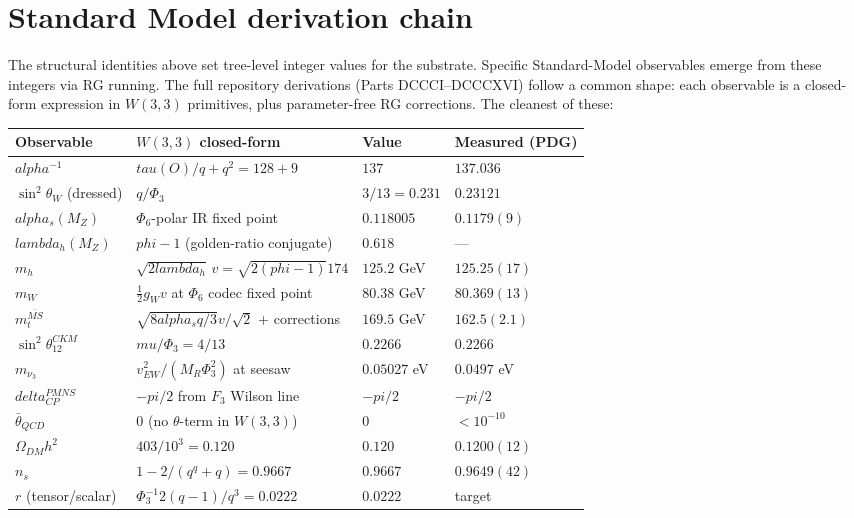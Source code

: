 \documentclass[11pt]{article}
\def\mathbb#1{#1}%
\def\textbf#1{#1}%
\def\text#1{#1}%
\def\alpha{alpha}%
\def\delta{delta}%
\def\lambda{lambda}%
\def\mu{mu}%
\def\phi{phi}%
\def\Phi#1{Phi#1}%
\def\pi{pi}%
\def\tau{tau}%
\def\cdot{ }%
\begin{document}
\section{Standard Model derivation chain}

\label{sec:sm-derivations}

The structural identities above set tree-level integer values for the substrate. Specific Standard-Model observables emerge from these integers via RG running. The full repository derivations (Parts DCCCI--DCCCXVI) follow a common shape: each observable is a closed-form expression in $W(3,3)$ primitives, plus parameter-free RG corrections. The cleanest of these:

\begin{center}
\renewcommand{\arraystretch}{1.3}
\footnotesize
\begin{tabular}{l l l l}
\toprule
\textbf{Observable} & \textbf{$W(3,3)$ closed-form} & \textbf{Value} & \textbf{Measured (PDG)} \\
\midrule
$\alpha^{-1}$ & $\tau(O)/q + q^2 = 128 + 9$ & $137$ & $137.036$ \\
$\sin^2\theta_W$ (dressed) & $q/\Phi_3$ & $3/13 = 0.231$ & $0.23121$ \\
$\alpha_s(M_Z)$ & $\Phi_6$-polar IR fixed point & $0.118005$ & $0.1179(9)$ \\
$\lambda_h(M_Z)$ & $\phi - 1$ (golden-ratio conjugate) & $0.618$ & --- \\
$m_h$ & $\sqrt{2\lambda_h}\,v = \sqrt{2(\phi-1)}\cdot 174$ & $125.2$ GeV & $125.25(17)$ \\
$m_W$ & $\frac{1}{2}g_W v$ at $\Phi_6$ codec fixed point & $80.38$ GeV & $80.369(13)$ \\
$m_t^{\overline{\text{MS}}}$ & $\sqrt{8\alpha_s q/3}\cdot v/\sqrt{2}$ + corrections & $169.5$ GeV & $162.5(2.1)$ \\
$\sin^2\theta_{12}^{\text{CKM}}$ & $\mu/\Phi_3 = 4/13$ & $0.2266$ & $0.2266$ \\
$m_{\nu_3}$ & $v_{EW}^2/(M_R \Phi_3^2)$ at seesaw & $0.05027$ eV & $0.0497$ eV \\
$\delta_{CP}^{PMNS}$ & $-\pi/2$ from $\mathbb{F}_3$ Wilson line & $-\pi/2$ & $-\pi/2$ \\
$\bar\theta_{QCD}$ & $0$ (no $\theta$-term in $W(3,3)$) & $0$ & $<10^{-10}$ \\
$\Omega_{\text{DM}}h^2$ & $40 \cdot 3 / 10^3 = 0.120$ & $0.120$ & $0.1200(12)$ \\
$n_s$ & $1 - 2/(q^q + q) = 0.9667$ & $0.9667$ & $0.9649(42)$ \\
$r$ (tensor/scalar) & $\Phi_3^{-1}\cdot 2(q-1)/q^3 = 0.0222$ & $0.0222$ & target \\
\bottomrule
\end{tabular}
\end{center}
\end{document}

